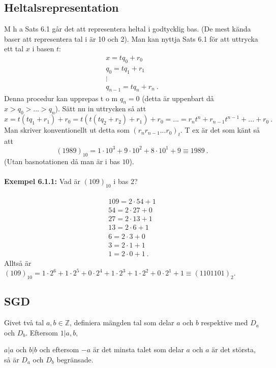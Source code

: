 \documentclass{article}
\begin{document}
\subsection{Heltalsrepresentation}
M h a Sats 6.1 går det att representera heltal i godtycklig bas. (De mest kända baser att representera tal i är 10 och 2). Man kan nyttja Sats 6.1 för att uttrycka ett tal $x$ i basen $t$:
\begin{equation*}
    \begin{split}
        x=tq_0+r_0 \\
        q_0=tq_1+r_1 \\
        \vdots \\
        q_{n-1}=tq_n+r_n \ .
    \end{split}
\end{equation*}
Denna procedur kan upprepas t o m $q_n=0$ (detta är uppenbart då $x>q_0>...>q_n$). Sätt nu in uttrycken så att
$$
x=t(tq_1+r_1)+r_0=t(t(tq_2+r_2)+r_1)+r_0=...=r_nt^n+r_{n-1}t^{n-1}+...+r_0 \ .
$$
Man skriver konventionellt ut detta som $(r_nr_{n-1}...r_0)_t$. T ex är det som känt så att
$$
(1989)_{10}=1\cdot10^3+9\cdot10^2+8\cdot10^1+9\equiv1989 \ .
$$
(Utan basnotationen då man är i bas $10$).\\ \\
\textbf{Exempel 6.1.1:} Vad är $(109)_{10}$ i bas $2$?\\ \\
\begin{equation*}
    \begin{split}
        109=2\cdot54+1 \\
        54=2\cdot27+0 \\
        27=2\cdot13+1 \\
        13=2\cdot6+1 \\
        6=2\cdot3+0 \\
        3=2\cdot1+1 \\
        1=2\cdot0+1 \ .
    \end{split}
\end{equation*}
Alltså är $(109)_{10}=1\cdot2^6+1\cdot2^5+0\cdot2^4+1\cdot2^3+1\cdot2^2+0\cdot2^1+1\equiv(1101101)_2$.

\subsection{SGD}
Givet två tal $a,b\in\mathbb{Z}$, definiera mängden tal som delar $a$ och $b$ respektive med $D_a$ och $D_b$. Eftersom $1|a,b$,

$a|a$ och $b|b$ och eftersom $-a$ är det minsta talet som delar $a$ och $a$ är det största, så är $D_a$ och $D_b$ begränsade. 
\end{document}
